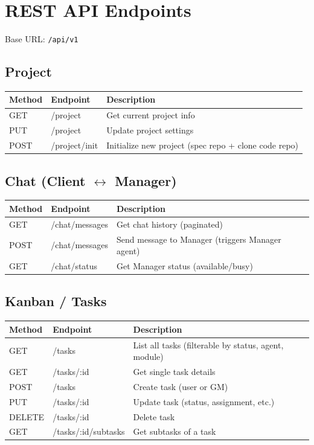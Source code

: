 \documentclass[11pt,a4paper]{article}
\begin{document}
\section{REST API Endpoints}

Base URL: \texttt{/api/v1}

\subsection{Project}

\begin{longtable}{p{2.5cm} p{4cm} p{7cm}}
\toprule
\textbf{Method} & \textbf{Endpoint} & \textbf{Description} \\
\midrule
\endhead
GET    & /project              & Get current project info \\
PUT    & /project              & Update project settings \\
POST   & /project/init         & Initialize new project (spec repo + clone code repo) \\
\bottomrule
\end{longtable}

\subsection{Chat (Client $\leftrightarrow$ Manager)}

\begin{longtable}{p{2.5cm} p{4cm} p{7cm}}
\toprule
\textbf{Method} & \textbf{Endpoint} & \textbf{Description} \\
\midrule
\endhead
GET    & /chat/messages        & Get chat history (paginated) \\
POST   & /chat/messages        & Send message to Manager (triggers Manager agent) \\
GET    & /chat/status          & Get Manager status (available/busy) \\
\bottomrule
\end{longtable}

\subsection{Kanban / Tasks}

\begin{longtable}{p{2.5cm} p{4cm} p{7cm}}
\toprule
\textbf{Method} & \textbf{Endpoint} & \textbf{Description} \\
\midrule
\endhead
GET    & /tasks                & List all tasks (filterable by status, agent, module) \\
GET    & /tasks/:id            & Get single task details \\
POST   & /tasks                & Create task (user or GM) \\
PUT    & /tasks/:id            & Update task (status, assignment, etc.) \\
DELETE & /tasks/:id            & Delete task \\
GET    & /tasks/:id/subtasks   & Get subtasks of a task \\
\bottomrule
\end{longtable}
\end{document}
